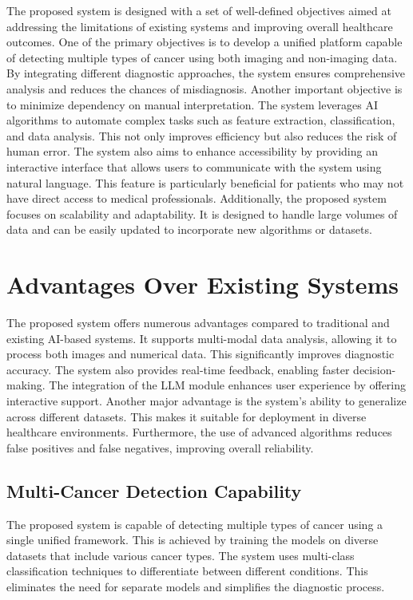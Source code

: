 \documentclass[a4paper,12pt]{report}
\begin{document}
\begin{doublespace}
The proposed system is designed with a set of well-defined objectives aimed at addressing the limitations of existing systems and improving overall healthcare outcomes.
One of the primary objectives is to develop a unified platform capable of detecting multiple types of cancer using both imaging and non-imaging data. By integrating different diagnostic approaches, the system ensures comprehensive analysis and reduces the chances of misdiagnosis.
Another important objective is to minimize dependency on manual interpretation. The system leverages AI algorithms to automate complex tasks such as feature extraction, classification, and data analysis. This not only improves efficiency but also reduces the risk of human error.
The system also aims to enhance accessibility by providing an interactive interface that allows users to communicate with the system using natural language. This feature is particularly beneficial for patients who may not have direct access to medical professionals.
Additionally, the proposed system focuses on scalability and adaptability. It is designed to handle large volumes of data and can be easily updated to incorporate new algorithms or datasets.

\section{Advantages Over Existing Systems}
\label{sec:advantages_over_existing}

The proposed system offers numerous advantages compared to traditional and existing AI-based systems.
It supports multi-modal data analysis, allowing it to process both images and numerical data. This significantly improves diagnostic accuracy.
The system also provides real-time feedback, enabling faster decision-making. The integration of the LLM module enhances user experience by offering interactive support.
Another major advantage is the system’s ability to generalize across different datasets. This makes it suitable for deployment in diverse healthcare environments.
Furthermore, the use of advanced algorithms reduces false positives and false negatives, improving overall reliability.


\subsection{Multi-Cancer Detection Capability}
\label{sec:multi_cancer_capability}

The proposed system is capable of detecting multiple types of cancer using a single unified framework. This is achieved by training the models on diverse datasets that include various cancer types.
The system uses multi-class classification techniques to differentiate between different conditions. This eliminates the need for separate models and simplifies the diagnostic process.

\end{doublespace}
\end{document}
